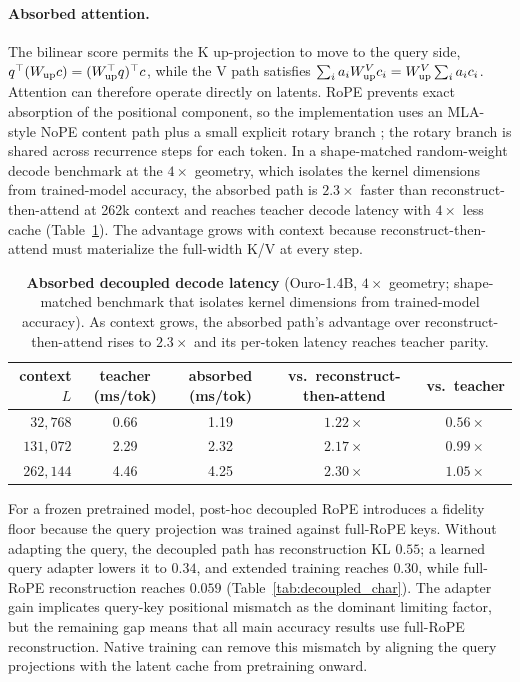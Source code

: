 \documentclass[10pt]{article}
\begin{document}
\paragraph{Absorbed attention.}
The bilinear score permits the K up-projection to move to the query side,
$q^\top(W_{\rm up}c)=(W_{\rm up}^\top q)^\top c$, while the V path satisfies
$\sum_i a_iW^V_{\rm up}c_i=W^V_{\rm up}\sum_i a_ic_i$. Attention can therefore operate directly on latents. RoPE prevents exact absorption of the positional component, so the implementation uses an MLA-style NoPE content path plus a small explicit rotary branch \citep{deepseekv2}; the rotary branch is shared across recurrence steps for each token. In a shape-matched random-weight decode benchmark at the $4\times$ geometry, which isolates the kernel dimensions from trained-model accuracy, the absorbed path is $2.3\times$ faster than reconstruct-then-attend at 262k context and reaches teacher decode latency with $4\times$ less cache (Table~\ref{tab:absorbed_latency}). The advantage grows with context because reconstruct-then-attend must materialize the full-width K/V at every step.

\begin{table}[h]\centering\small
\caption{\textbf{Absorbed decoupled decode latency} (Ouro-1.4B, $4\times$ geometry; shape-matched benchmark that isolates kernel dimensions from trained-model accuracy). As context grows, the absorbed path's advantage over reconstruct-then-attend rises to $2.3\times$ and its per-token latency reaches teacher parity.}
\label{tab:absorbed_latency}
\begin{tabular}{rcccc}
\toprule
context $L$ & teacher (ms/tok) & absorbed (ms/tok) & vs.\ reconstruct-then-attend & vs.\ teacher \\
\midrule
$32{,}768$  & 0.66 & 1.19 & $1.22\times$ & $0.56\times$ \\
$131{,}072$ & 2.29 & 2.32 & $2.17\times$ & $0.99\times$ \\
$262{,}144$ & 4.46 & 4.25 & $2.30\times$ & $1.05\times$ \\
\bottomrule
\end{tabular}
\end{table}

For a frozen pretrained model, post-hoc decoupled RoPE introduces a fidelity floor because the query projection was trained against full-RoPE keys. Without adapting the query, the decoupled path has reconstruction KL $0.55$; a learned query adapter lowers it to $0.34$, and extended training reaches $0.30$, while full-RoPE reconstruction reaches $0.059$ (Table~\ref{tab:decoupled_char}). The adapter gain implicates query-key positional mismatch as the dominant limiting factor, but the remaining gap means that all main accuracy results use full-RoPE reconstruction. Native training can remove this mismatch by aligning the query projections with the latent cache from pretraining onward.
\end{document}
